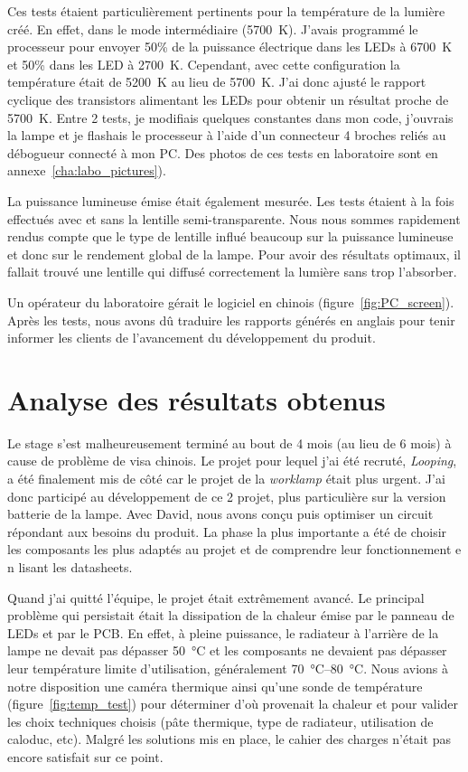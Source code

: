 \documentclass[a4paper, 12pt, sffamily]{report}
\begin{document}
Ces tests étaient particulièrement pertinents pour la température de la lumière créé. En effet, dans le mode intermédiaire (\SI{5700}{\kelvin}). J'avais programmé le processeur pour envoyer 50\% de la puissance électrique dans les LEDs à \SI{6700}{\kelvin} et 50\% dans les LED à \SI{2700}{\kelvin}. Cependant, avec cette configuration la température était de \SI{5200}{\kelvin} au lieu de \SI{5700}{\kelvin}. J'ai donc ajusté le rapport cyclique des transistors alimentant les LEDs pour obtenir un résultat proche de \SI{5700}{\kelvin}. Entre 2 tests, je modifiais quelques constantes dans mon code, j'ouvrais la lampe et je flashais le processeur à l'aide d'un connecteur 4 broches reliés au débogueur connecté à mon PC. Des photos de ces tests en laboratoire sont en annexe~\ref{cha:labo_pictures}).

La puissance lumineuse émise était également mesurée. Les tests étaient à la fois effectués avec et sans la lentille semi-transparente. Nous nous sommes rapidement rendus compte que le type de lentille influé beaucoup sur la puissance lumineuse et donc sur le rendement global de la lampe. Pour avoir des résultats optimaux, il fallait trouvé une lentille qui diffusé correctement la lumière sans trop l'absorber.

Un opérateur du laboratoire gérait le logiciel en chinois (figure~\ref{fig:PC_screen}). Après les tests, nous avons dû traduire les rapports générés en anglais pour tenir informer les clients de l'avancement du développement du produit.  


\chapter{Analyse des résultats obtenus}

Le stage s'est malheureusement terminé au bout de 4 mois (au lieu de 6 mois) à cause de problème de visa chinois. Le projet pour lequel j'ai été recruté, \emph{Looping}, a été finalement mis de côté car le projet de la \emph{worklamp} était plus urgent. J'ai donc participé au développement de ce 2\ieme{} projet, plus particulière sur la version batterie de la lampe. Avec David, nous avons conçu puis optimiser un circuit répondant aux besoins du produit. La phase la plus importante a été de choisir les composants les plus adaptés au projet et de comprendre leur fonctionnement e n lisant les datasheets.

Quand j'ai quitté l'équipe, le projet était extrêmement avancé. Le principal problème qui persistait était la dissipation de la chaleur émise par le panneau de LEDs et par le PCB. En effet, à pleine puissance, le radiateur à l'arrière de la lampe ne devait pas dépasser \SI{50}{\celsius} et les composants ne devaient pas dépasser leur température limite d'utilisation, généralement \SIrange{70}{80}{\celsius}. Nous avions à notre disposition une caméra thermique ainsi qu'une sonde de température (figure~\ref{fig:temp_test}) pour déterminer d'où provenait la chaleur et pour valider les choix techniques choisis (pâte thermique, type de radiateur, utilisation de caloduc, etc). Malgré les solutions mis en place, le cahier des charges n'était pas encore satisfait sur ce point.
\end{document}
